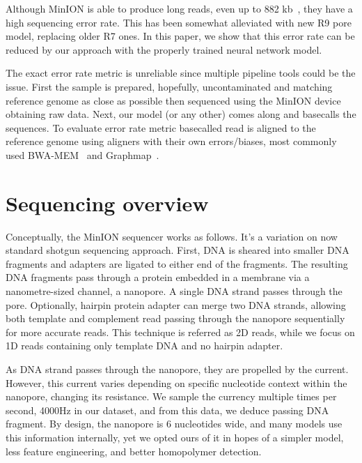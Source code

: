 \documentclass[runningheads,a4paper]{llncs}
\begin{document}
Although MinION is able to produce long reads, even up to 882 kb~\cite{loman1-100k,loman2-800k}, they have a high sequencing error rate. This has been somewhat alleviated with new R9 pore model, replacing older R7 ones. In this paper, we show that this error rate can be reduced by our approach with the properly trained neural network model.

The exact error rate metric is unreliable since multiple pipeline tools could be the issue. First the sample is prepared, hopefully, uncontaminated and matching reference genome as close as possible then sequenced using the MinION device obtaining raw data. Next, our model (or any other) comes along and basecalls the sequences. To evaluate error rate metric basecalled read is aligned to the reference genome using aligners with their own errors/biases, most commonly used BWA-MEM~\cite{li2013aligning} and Graphmap~\cite{sovic2016fast}.

\section{Sequencing overview}
Conceptually, the MinION sequencer works as follows. It's a variation on now standard shotgun sequencing approach. First, DNA is sheared into smaller DNA fragments and adapters are ligated to either end of the fragments. The resulting DNA fragments pass through a protein embedded in a membrane via a nanometre-sized channel, a nanopore. A single DNA strand passes through the pore. Optionally, hairpin protein adapter can merge two DNA strands, allowing both template and complement read passing through the nanopore sequentially for more accurate reads. This technique is referred as 2D reads, while we focus on 1D reads containing only template DNA and no hairpin adapter.

As DNA strand passes through the nanopore, they are propelled by the current. However, this current varies depending on specific nucleotide context within the nanopore, changing its resistance. We sample the currency multiple times per second, 4000Hz in our dataset, and from this data, we deduce passing DNA fragment. By design, the nanopore is 6 nucleotides wide, and many models use this information internally, yet we opted ours of it in hopes of a simpler model, less feature engineering, and better homopolymer detection.


\end{document}
